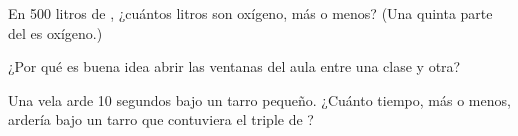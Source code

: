 \begin{exercise}[$\star$]\label{exo:g4:air-a-mixture-of-gases:9}
En 500 litros de , ¿cuántos litros son oxígeno, más o menos? (Una
quinta parte del  es oxígeno.)
\end{exercise}

\begin{exercise}[$\star\star$]\label{exo:g4:air-a-mixture-of-gases:10}
¿Por qué es buena idea abrir las ventanas del aula entre una clase y
otra?
\end{exercise}

\begin{exercise}[$\star\star$]\label{exo:g4:air-a-mixture-of-gases:11}
Una vela arde 10 segundos bajo un tarro pequeño. ¿Cuánto tiempo, más o
menos, ardería bajo un tarro que contuviera el triple de ?
\end{exercise}
